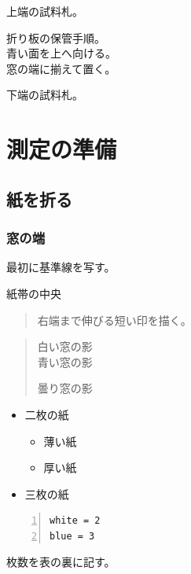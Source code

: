\documentclass[a4paper,11pt]{ltjsarticle}
\begin{document}
\begin{titlepage}
\noindent 上端の試料札。
\vfill
\noindent\begin{minipage}{.6\linewidth}
\small 折り板の保管手順。\\
青い面を上へ向ける。\\
窓の端に揃えて置く。
\end{minipage}
\vfill
\noindent 下端の試料札。
\end{titlepage}
\section{測定の準備}
\subsection{紙を折る}
\subsubsection*{窓の端}
最初に基準線を写す。
\begin{center}紙帯の中央\end{center}
\begin{quote}右端まで伸びる短い印を描く。\end{quote}
\begin{verse}
白い窓の影\\
青い窓の影

曇り窓の影
\end{verse}
\begin{itemize}[itemsep=3pt]
\item 二枚の紙
\begin{itemize}
\item 薄い紙
\item 厚い紙
\end{itemize}
\item 三枚の紙
\end{itemize}
\begin{lstlisting}[basicstyle=\small\ttfamily,numbers=left,caption={紙の枚数}]
white = 2
blue = 3
\end{lstlisting}
枚数を表の裏に記す。
\end{document}
